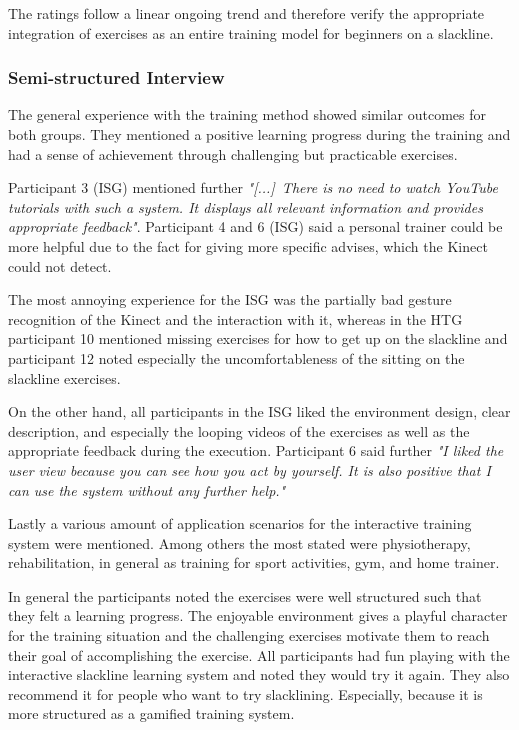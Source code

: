 The ratings follow a linear ongoing trend and therefore verify the appropriate integration of exercises as an entire training model for beginners on a slackline.


\subsubsection{Semi-structured Interview}
The general experience with the training method showed similar outcomes for both groups. 
They mentioned a positive learning progress during the training and had a sense of achievement through challenging but practicable exercises.

Participant 3 (ISG) mentioned further \textit{"[...]~There is no need to watch YouTube tutorials with such a system. It displays all relevant information and provides appropriate feedback"}.
Participant 4 and 6 (ISG) said a personal trainer could be more helpful due to the fact for giving more specific advises, which the Kinect could not detect.

The most annoying experience for the ISG was the partially bad gesture recognition of the Kinect and the interaction with it, whereas in the HTG participant 10 mentioned missing exercises for how to get up on the slackline and participant 12 noted especially the uncomfortableness of the sitting on the slackline exercises.

On the other hand, all participants in the ISG liked the environment design, clear description, and especially the looping videos of the exercises as well as the appropriate feedback during the execution.
Participant 6 said further \textit{"I liked the user view because you can see how you act by yourself. It is also positive that I can use the system without any further help."}

Lastly a various amount of application scenarios for the interactive training system were mentioned.
Among others the most stated were physiotherapy, rehabilitation, in general as training for sport activities, gym, and home trainer.

In general the participants noted the exercises were well structured such that they felt a learning progress.
The enjoyable environment gives a playful character for the training situation and the challenging exercises motivate them to reach their goal of accomplishing the exercise.
All participants had fun playing with the interactive slackline learning system and noted they would try it again.
They also recommend it for people who want to try slacklining.
Especially, because it is more structured as a gamified training system.